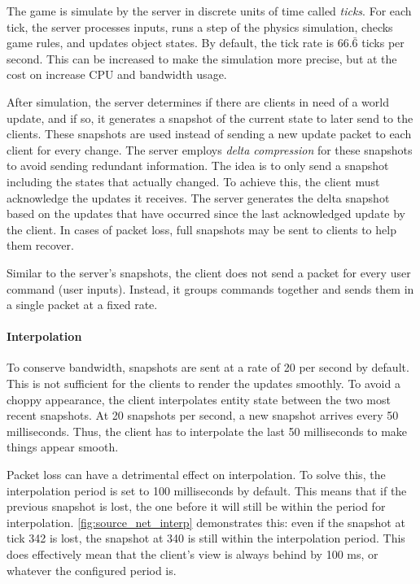\documentclass[a4paper, 12pt]{scrartcl}
\begin{document}
The game is simulate by the server in discrete units of time called \textit{ticks}. For each tick, the server processes inputs, runs a step of the physics simulation, checks game rules, and updates object states. By default, the tick rate is $66.\bar6$ ticks per second. This can be increased to make the simulation more precise, but at the cost on increase CPU and bandwidth usage.

After simulation, the server determines if there are clients in need of a world update, and if so, it generates a snapshot of the current state to later send to the clients. These snapshots are used instead of sending a new update packet to each client for every change. The server employs \textit{delta compression} for these snapshots to avoid sending redundant information. The idea is to only send a snapshot including the states that actually changed. To achieve this, the client must acknowledge the updates it receives. The server generates the delta snapshot based on the updates that have occurred since the last acknowledged update by the client. In cases of packet loss, full snapshots may be sent to clients to help them recover.

Similar to the server's snapshots, the client does not send a packet for every user command (user inputs). Instead, it groups commands together and sends them in a single packet at a fixed rate.

\paragraph{Interpolation}
To conserve bandwidth, snapshots are sent at a rate of 20 per second by default. This is not sufficient for the clients to render the updates smoothly. To avoid a choppy appearance, the client interpolates entity state between the two most recent snapshots. At 20 snapshots per second, a new snapshot arrives every 50 milliseconds. Thus, the client has to interpolate the last 50 milliseconds to make things appear smooth.

Packet loss can have a detrimental effect on interpolation. To solve this, the interpolation period is set to 100 milliseconds by default. This means that if the previous snapshot is lost, the one before it will still be within the period for interpolation. \cref{fig:source_net_interp} demonstrates this: even if the snapshot at tick 342 is lost, the snapshot at 340 is still within the interpolation period. This does effectively mean that the client's view is always behind by 100 ms, or whatever the configured period is.
\end{document}
